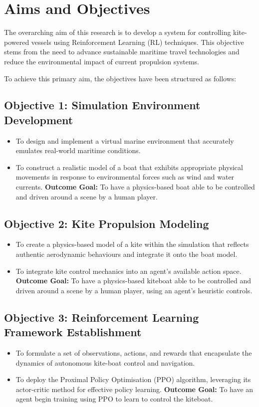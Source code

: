\section{Aims and Objectives}

The overarching aim of this research is to develop a system for controlling kite-powered vessels using Reinforcement Learning (RL) techniques. This objective stems from the need to advance sustainable maritime travel technologies and reduce the environmental impact of current propulsion systems. 

To achieve this primary aim, the objectives have been structured as follows:

\subsection*{Objective 1: Simulation Environment Development}
\begin{itemize}
    \item To design and implement a virtual marine environment that accurately emulates real-world maritime conditions.
    \item To construct a realistic model of a boat that exhibits appropriate physical movements in response to environmental forces such as wind and water currents.
    \newline\textbf{Outcome Goal:} To have a physics-based boat able to be controlled and driven around a scene by a human player.
\end{itemize}

\subsection*{Objective 2: Kite Propulsion Modeling}
\begin{itemize}
    \item To create a physics-based model of a kite within the simulation that reflects authentic aerodynamic behaviours and integrate it onto the boat model.
    \item To integrate kite control mechanics into an agent’s available action space.
    \newline\textbf{Outcome Goal:} To have a physics-based kiteboat able to be controlled and driven around a scene by a human player, using an agent's heuristic controls.
\end{itemize}

\subsection*{Objective 3: Reinforcement Learning Framework Establishment}
\begin{itemize}
    \item To formulate a set of observations, actions, and rewards that encapsulate the dynamics of autonomous kite-boat control and navigation.
    \item To deploy the Proximal Policy Optimisation (PPO) algorithm, leveraging its actor-critic method for effective policy learning.
    \newline\textbf{Outcome Goal:} To have an agent begin training using PPO to learn to control the kiteboat.
\end{itemize}

